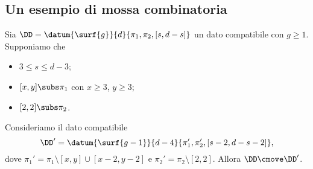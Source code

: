 \subsection{Un esempio di mossa combinatoria}
\begin{frame}
\begin{mybox}
Sia $\DD=\datum{\surf{g}}{d}{\pi_1,\pi_2,[s,d-s]}$ un dato compatibile con $g\ge 1$. Supponiamo che
\begin{itemize}
\item $3\le s\le d-3$;
\item $[x,y]\subs\pi_1$ con $x\ge 3$, $y\ge 3$;
\item $[2,2]\subs\pi_2$.
\end{itemize}
Consideriamo il dato compatibile
\[
\DD'=\datum{\surf{g-1}}{d-4}{\pi_1',\pi_2',[s-2,d-s-2]},
\]
dove $\pi_1'=\pi_1\setminus[x,y]\cup[x-2,y-2]$ e $\pi_2'=\pi_2\setminus[2,2]$. Allora $\DD\cmove\DD'$.
\end{mybox}
\end{frame}

